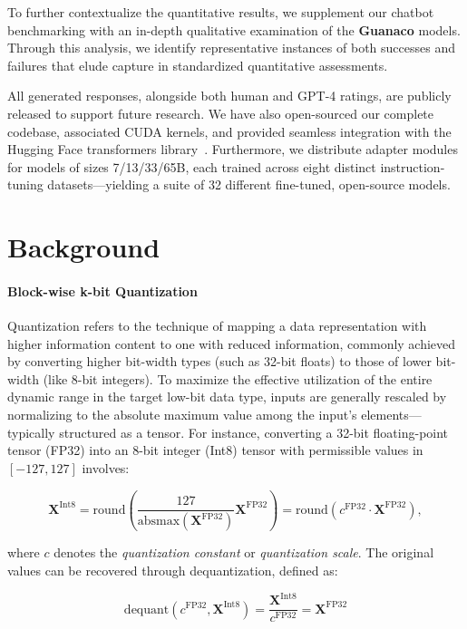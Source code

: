 To further contextualize the quantitative results, we supplement our chatbot benchmarking with an in-depth qualitative examination of the \textbf{Guanaco} models. Through this analysis, we identify representative instances of both successes and failures that elude capture in standardized quantitative assessments.

All generated responses, alongside both human and GPT-4 ratings, are publicly released to support future research. We have also open-sourced our complete codebase, associated CUDA kernels, and provided seamless integration with the Hugging Face transformers library~\citep{wolf2019huggingface}. Furthermore, we distribute adapter modules for models of sizes 7/13/33/65B, each trained across eight distinct instruction-tuning datasets—yielding a suite of 32 different fine-tuned, open-source models.

\section{Background}
\paragraph{Block-wise k-bit Quantization} Quantization refers to the technique of mapping a data representation with higher information content to one with reduced information, commonly achieved by converting higher bit-width types (such as 32-bit floats) to those of lower bit-width (like 8-bit integers). To maximize the effective utilization of the entire dynamic range in the target low-bit data type, inputs are generally rescaled by normalizing to the absolute maximum value among the input’s elements—typically structured as a tensor. For instance, converting a 32-bit floating-point tensor (FP32) into an 8-bit integer (Int8) tensor with permissible values in $[-127, 127]$ involves:

\begin{equation}
    \mathbf{X}^{ \text{Int8}} = \text{round}\left( \frac{127}{{\text{absmax}}(\mathbf{X}^{{\text{FP32}}})}\mathbf{X}^{{\text{FP32}}} \right) = \text{round}(c^{\text{FP32}}\cdot \mathbf{X}^{{\text{FP32}}}),
\end{equation}

where $c$ denotes the {\em quantization constant} or {\em quantization scale}. The original values can be recovered through dequantization, defined as:

\begin{equation}
    \text{dequant}(c^{\text{FP32}}, \mathbf{X}^{\text{Int8}}) = \frac{\mathbf{X}^{\text{Int8}}}{c^{\text{FP32}}} = \mathbf{X}^{\text{FP32}}
\end{equation}


